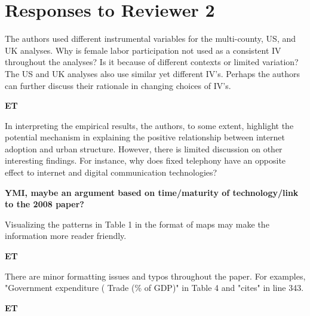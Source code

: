 \documentclass[11pt, a4paper, answers]{exam}
\begin{document}
\section*{Responses to Reviewer 2}

\begin{questions}

\question The authors used different instrumental variables for 
the multi-county, US, and UK analyses. Why is female labor 
participation not used as a consistent IV throughout the 
analyses? Is it because of different contexts or limited variation? 
The US and UK analyses also use similar yet different IV's. 
Perhaps the authors can further discuss their rationale in changing choices of IV's.

\begin{solution}
\textbf{ET}
\end{solution}

\question In interpreting the empirical results, the authors, 
to some extent, highlight the potential mechanism in explaining 
the positive relationship between internet adoption and urban 
structure. However, there is limited discussion on other interesting 
findings. For instance, why does fixed telephony have an opposite 
effect to internet and digital communication technologies?

\begin{solution}
\textbf{YMI, maybe an argument based on time/maturity of technology/link to the 
2008 paper?}
\end{solution}

\question Visualizing the patterns in Table 1 in the format of maps 
may make the information more reader friendly.

\begin{solution}
\textbf{ET}
\end{solution}

\question There are minor formatting issues and typos throughout 
the paper. For examples, "Government expenditure ( Trade (\% of GDP)" 
in Table 4 and "cites" in line 343.

\begin{solution}
\textbf{ET}
\end{solution}
\end{questions}

\clearpage
\end{document}
